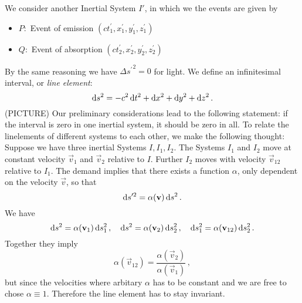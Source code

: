 We consider another Inertial System $I'$, in which we the events are given by
\begin{itemize}
    \item $P:$ Event of emission $(ct_1^\prime,x_1^\prime,y_1^\prime,z_1^\prime)$
    \item $Q:$ Event of absorption
    $(ct_2^\prime,x_2^\prime,y_2^\prime,z_2^\prime)$
\end{itemize}
By the same reasoning we have ${\Delta s^\prime}^2=0$ for light.
We define an infinitesimal interval, or \emph{line element}:
\begin{equation}
    \dif s^2=-c^2\dif t^2+\dif x^2+\dif y^2+\dif z^2\, .
\end{equation}
(PICTURE)
Our preliminary considerations lead to the following statement: if the interval
is zero in one inertial system, it should be zero in all.
To relate the linelements of different systems to each other, we make the following thought:
Suppose we have three inertial Systems $I,I_1,I_2$.
The Systems $I_1$ and $I_2$ move at constant velocity $\vec{v}_1$ and $\vec{v}_2$ relative to $I$. Further
$I_2$ moves with velocity $\vec{v}_{12}$ relative to $I_1$. The demand implies
that there exists a function $\alpha$, only dependent on the velocity $\vec{v}$,
so that
\begin{equation}
    \dif s'^2=\alpha(\vec{v})\dif s^2\, .
\end{equation}
We have
\begin{equation}
    \dif s^2=\alpha(\vec{v}_1)\dif s_1^2\, ,\quad\dif s^2=\alpha(\vec{v}_2)\dif
    s_2^2\, ,\quad\dif s_1^2=\alpha(\vec{v}_{12})\dif s_2^2\, .
\end{equation}
Together they imply
\begin{equation}
    \alpha(\vec{v}_{12})=\frac{\alpha(\vec{v}_{2})}{\alpha(\vec{v}_{1})}\, ,
\end{equation}
but since the velocities where arbitary $\alpha$ has to be constant and we are
free to chose $\alpha\equiv 1$. Therefore the line element has to stay
invariant.
